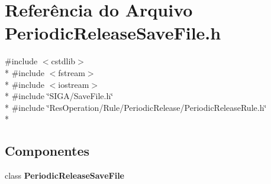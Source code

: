 \section{Referência do Arquivo Periodic\+Release\+Save\+File.\+h}
\label{_periodic_release_save_file_8h}
{\ttfamily \#include $<$cstdlib$>$}\\*
{\ttfamily \#include $<$fstream$>$}\\*
{\ttfamily \#include $<$iostream$>$}\\*
{\ttfamily \#include \char`\"{}S\+I\+G\+A/\+Save\+File.\+h\char`\"{}}\\*
{\ttfamily \#include \char`\"{}Res\+Operation/\+Rule/\+Periodic\+Release/\+Periodic\+Release\+Rule.\+h\char`\"{}}\\*
\subsection*{Componentes}
\begin{DoxyCompactItemize}
\item 
class {\bf Periodic\+Release\+Save\+File}
\end{DoxyCompactItemize}

